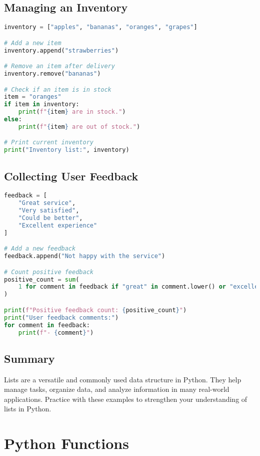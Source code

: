 \section{Managing an Inventory}

\begin{lstlisting}[language=Python]
inventory = ["apples", "bananas", "oranges", "grapes"]

# Add a new item
inventory.append("strawberries")

# Remove an item after delivery
inventory.remove("bananas")

# Check if an item is in stock
item = "oranges"
if item in inventory:
    print(f"{item} are in stock.")
else:
    print(f"{item} are out of stock.")

# Print current inventory
print("Inventory list:", inventory)
\end{lstlisting}

\section{Collecting User Feedback}

\begin{lstlisting}[language=Python]
feedback = [
    "Great service",
    "Very satisfied",
    "Could be better",
    "Excellent experience"
]

# Add a new feedback
feedback.append("Not happy with the service")

# Count positive feedback
positive_count = sum(
    1 for comment in feedback if "great" in comment.lower() or "excellent" in comment.lower()
)

print(f"Positive feedback count: {positive_count}")
print("User feedback comments:")
for comment in feedback:
    print(f"- {comment}")
\end{lstlisting}

\section{Summary}

Lists are a versatile and commonly used data structure in Python.  
They help manage tasks, organize data, and analyze information in many real-world applications.  
Practice with these examples to strengthen your understanding of lists in Python.

\chapter{Python Functions}

